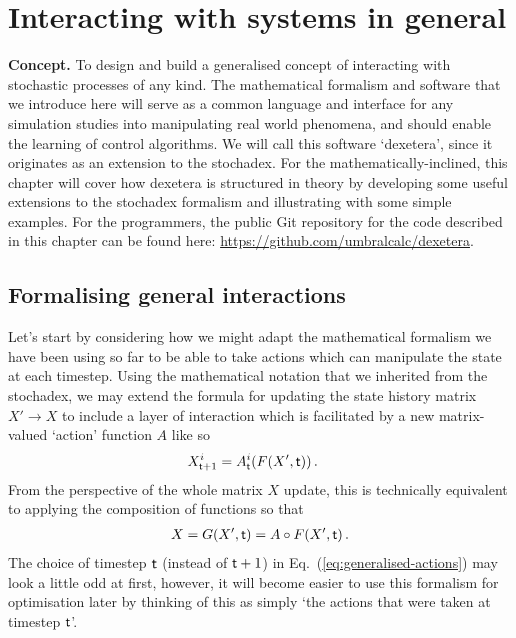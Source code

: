 \chapter{\sffamily Interacting with systems in general}

{\bfseries\sffamily Concept.} To design and build a generalised concept of interacting with stochastic processes of any kind. The mathematical formalism and software that we introduce here will serve as a common language and interface for any simulation studies into manipulating real world phenomena, and should enable the learning of control algorithms. We will call this software `dexetera', since it originates as an extension to the stochadex. For the mathematically-inclined, this chapter will cover how dexetera is structured in theory by developing some useful extensions to the stochadex formalism and illustrating with some simple examples. For the programmers, the public Git repository for the code described in this chapter can be found here: \href{https://github.com/umbralcalc/dexetera}{https://github.com/umbralcalc/dexetera}.

\section{\sffamily Formalising general interactions}

Let's start by considering how we might adapt the mathematical formalism we have been using so far to be able to take actions which can manipulate the state at each timestep. Using the mathematical notation that we inherited from the stochadex, we may extend the formula for updating the state history matrix $X'\rightarrow X$ to include a layer of interaction which is facilitated by a new matrix-valued `action' function $A$ like so
\begin{align}
X_{{\sf t}+1}^i &= A^i_{{\sf t}}(F(X', {\sf t})) \label{eq:generalised-actions} \,.
\end{align}
From the perspective of the whole matrix $X$ update, this is technically equivalent to applying the composition of functions so that
\begin{align}
X = G(X', {\sf t})=A\circ F(X', {\sf t}) \,.
\end{align}
The choice of timestep ${\sf t}$ (instead of ${\sf t}+1$) in Eq.~(\ref{eq:generalised-actions}) may look a little odd at first, however, it will become easier to use this formalism for optimisation later by thinking of this as simply `the actions that were taken at timestep ${\sf t}$'.